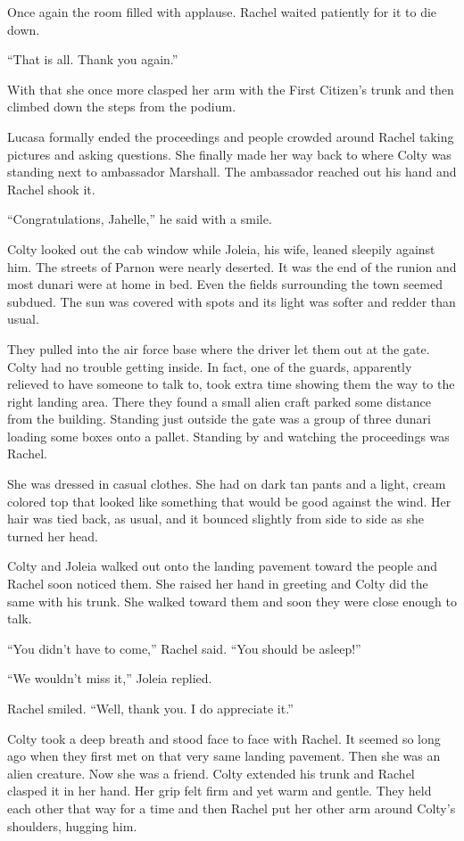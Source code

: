 Once again the room filled with applause. Rachel waited patiently for it to die down.

``That is all. Thank you again.''

With that she once more clasped her arm with the First Citizen's trunk and then climbed down the
steps from the podium.

Lucasa formally ended the proceedings and people crowded around Rachel taking pictures and
asking questions. She finally made her way back to where Colty was standing next to ambassador
Marshall. The ambassador reached out his hand and Rachel shook it.

``Congratulations, Jahelle,'' he said with a smile.

\spacebreak

Colty looked out the cab window while Joleia, his wife, leaned sleepily against him. The streets
of Parnon were nearly deserted. It was the end of the runion and most dunari were at home in
bed. Even the fields surrounding the town seemed subdued. The sun was covered with spots and its
light was softer and redder than usual.

They pulled into the air force base where the driver let them out at the gate. Colty had no
trouble getting inside. In fact, one of the guards, apparently relieved to have someone to talk
to, took extra time showing them the way to the right landing area. There they found a small
alien craft parked some distance from the building. Standing just outside the gate was a group
of three dunari loading some boxes onto a pallet. Standing by and watching the proceedings was
Rachel.

She was dressed in casual clothes. She had on dark tan pants and a light, cream colored top that
looked like something that would be good against the wind. Her hair was tied back, as usual, and
it bounced slightly from side to side as she turned her head.

Colty and Joleia walked out onto the landing pavement toward the people and Rachel soon noticed
them. She raised her hand in greeting and Colty did the same with his trunk. She walked toward
them and soon they were close enough to talk.

``You didn't have to come,'' Rachel said. ``You should be asleep!''

``We wouldn't miss it,'' Joleia replied.

Rachel smiled. ``Well, thank you. I do appreciate it.''

Colty took a deep breath and stood face to face with Rachel. It seemed so long ago when they
first met on that very same landing pavement. Then she was an alien creature. Now she was a
friend. Colty extended his trunk and Rachel clasped it in her hand. Her grip felt firm and yet
warm and gentle. They held each other that way for a time and then Rachel put her other arm
around Colty's shoulders, hugging him.

